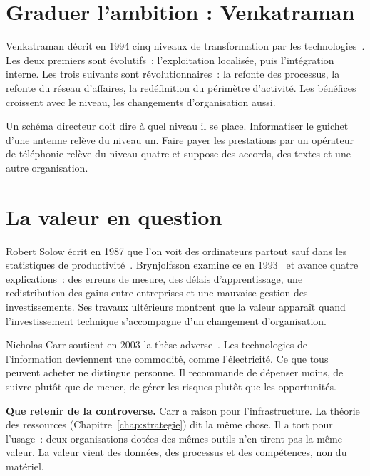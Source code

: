 \section{Graduer l'ambition : Venkatraman}
\label{sec:c03-venkatraman}

Venkatraman décrit en 1994 cinq niveaux de transformation par les technologies~\cite{venkatraman1994}. Les deux
premiers sont évolutifs~: l'exploitation localisée, puis l'intégration interne. Les trois suivants sont
révolutionnaires~: la refonte des processus, la refonte du réseau d'affaires, la redéfinition du périmètre
d'activité. Les bénéfices croissent avec le niveau, les changements d'organisation aussi.

Un schéma directeur doit dire à quel niveau il se place. Informatiser le guichet d'une antenne relève du niveau
un. Faire payer les prestations par un opérateur de téléphonie relève du niveau quatre et suppose des accords,
des textes et une autre organisation.

\section{La valeur en question}
\label{sec:c03-valeur}

Robert Solow écrit en 1987 que l'on voit des ordinateurs partout sauf dans les statistiques de
productivité~\cite{solow1987}. Brynjolfsson examine ce  en
1993~\cite{brynjolfsson1993} et avance quatre explications~: des erreurs de mesure, des délais d'apprentissage,
une redistribution des gains entre entreprises et une mauvaise gestion des investissements. Ses travaux
ultérieurs montrent que la valeur apparaît quand l'investissement technique s'accompagne d'un changement
d'organisation.

Nicholas Carr soutient en 2003 la thèse adverse~\cite{carr2003}. Les technologies de l'information deviennent
une commodité, comme l'électricité. Ce que tous peuvent acheter ne distingue personne. Il recommande de dépenser
moins, de suivre plutôt que de mener, de gérer les risques plutôt que les opportunités.

\begin{boxinfo}
\textbf{Que retenir de la controverse.} Carr a raison pour l'infrastructure. La théorie des ressources
(Chapitre~\ref{chap:strategie}) dit la même chose. Il a tort pour l'usage~: deux organisations dotées des mêmes
outils n'en tirent pas la même valeur. La valeur vient des données, des processus et des compétences, non du
matériel.
\end{boxinfo}

